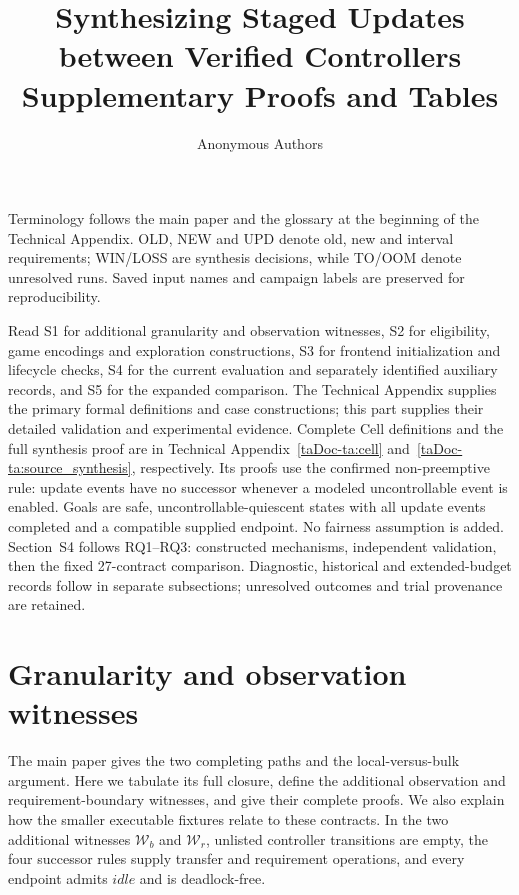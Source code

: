 \documentclass[11pt]{article}
\title{Synthesizing Staged Updates\\between Verified Controllers\\Supplementary Proofs and Tables}
\author{Anonymous Authors}
\date{}
\begin{document}

\maketitle
Terminology follows the main paper and the glossary at the beginning of the Technical Appendix. OLD, NEW and UPD denote old, new and interval requirements; WIN/LOSS are synthesis decisions, while TO/OOM denote unresolved runs. Saved input names and campaign labels are preserved for reproducibility.

Read S1 for additional granularity and observation witnesses, S2 for eligibility, game encodings and exploration constructions, S3 for frontend initialization and lifecycle checks, S4 for the current evaluation and separately identified auxiliary records, and S5 for the expanded comparison. The Technical Appendix supplies the primary formal definitions and case constructions; this part supplies their detailed validation and experimental evidence. Complete Cell definitions and the full synthesis proof are in Technical Appendix~\ref{taDoc-ta:cell} and~\ref{taDoc-ta:source_synthesis}, respectively. Its proofs use the confirmed non-preemptive rule: update events have no successor whenever a modeled uncontrollable event is enabled. Goals are safe, uncontrollable-quiescent states with all update events completed and a compatible supplied endpoint. No fairness assumption is added. Section~S4 follows RQ1--RQ3: constructed mechanisms, independent validation, then the fixed 27-contract comparison. Diagnostic, historical and extended-budget records follow in separate subsections; unresolved outcomes and trial provenance are retained.

\section{Granularity and observation witnesses}
\label{supp:witnesses}
The main paper gives the two completing paths and the local-versus-bulk argument. Here we tabulate its full closure, define the additional observation and requirement-boundary witnesses, and give their complete proofs. We also explain how the smaller executable fixtures relate to these contracts. In the two additional witnesses $\mathcal W_b$ and $\mathcal W_r$, unlisted controller transitions are empty, the four successor rules supply transfer and requirement operations, and every endpoint admits $idle$ and is deadlock-free.
\end{document}
